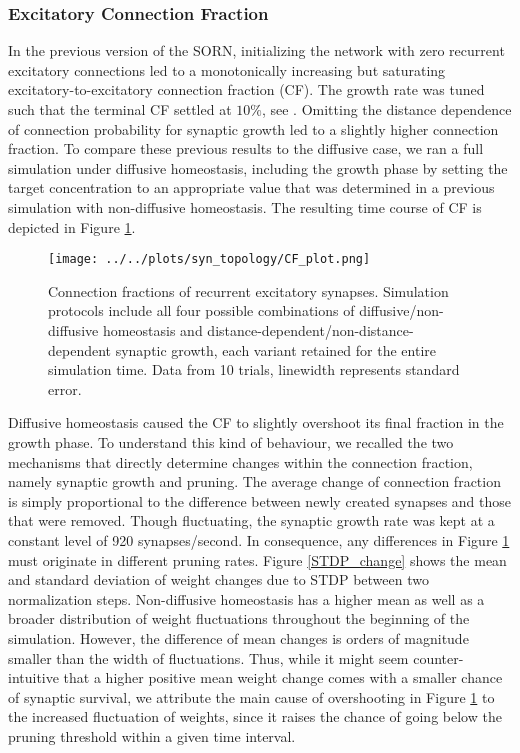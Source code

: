 \documentclass[10pt,a4paper]{article}
\begin{document}
\subsubsection{Excitatory Connection Fraction}
In the previous version of the SORN, initializing the network with zero recurrent excitatory connections led to a monotonically increasing but saturating excitatory-to-excitatory connection fraction (CF). The growth rate was tuned such that the terminal CF settled at $\mathrm{10\%}$, see \cite[p. 8]{SORN_Paper}. Omitting the distance dependence of connection probability for synaptic growth led to a slightly higher connection fraction. To compare these previous results to the diffusive case, we ran a full simulation under diffusive homeostasis, including the growth phase by setting the target concentration to an appropriate value that was determined in a previous simulation with non-diffusive homeostasis. The resulting time course of CF is depicted in Figure \ref{CF_plot}.
\begin{figure}
\texttt{[image: ../../plots/syn\_topology/CF\_plot.png]}
\caption{Connection fractions of recurrent excitatory synapses. Simulation protocols include all four possible combinations of diffusive/non-diffusive homeostasis and distance-dependent/non-distance-dependent synaptic growth, each variant retained for the entire simulation time. Data from 10 trials, linewidth represents standard error.}
\label{CF_plot}
\end{figure}
Diffusive homeostasis caused the CF to slightly overshoot its final fraction in the growth phase. To understand this kind of behaviour, we recalled the two mechanisms that directly determine changes within the connection fraction, namely synaptic growth and pruning. The average change of connection fraction is simply proportional to the difference between newly created synapses and those that were removed. Though fluctuating, the synaptic growth rate was kept at a constant level of 920 synapses/second. In consequence, any differences in Figure \ref{CF_plot} must originate in different pruning rates. Figure \ref{STDP_change} shows the mean and standard deviation of weight changes due to STDP between two normalization steps. Non-diffusive homeostasis has a higher mean as well as a broader distribution of weight fluctuations throughout the beginning of the simulation. However, the difference of mean changes is orders of magnitude smaller than the width of fluctuations. Thus, while it might seem counter-intuitive that a higher positive mean weight change comes with a smaller chance of synaptic survival, we attribute the main cause of overshooting in Figure \ref{CF_plot} to the increased fluctuation of weights, since it raises the chance of going below the pruning threshold within a given time interval.
\end{document}
